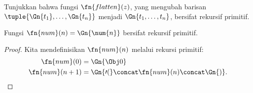 \documentclass[../../../include/open-logic-section]{subfiles}
\begin{document}
\begin{prob}
Tunjukkan bahwa fungsi $\fn{flatten}(z)$, yang mengubah barisan
$\tuple{\Gn{t_1}, \dots, \Gn{t_n}}$ menjadi $\Gn{t_1, \dots, t_n}$,
bersifat rekursif primitif.
\end{prob}

\begin{prop}
  Fungsi $\fn{num}(n) = \Gn{\num{n}}$ bersifat rekursif primitif.
\end{prop}

\begin{proof}
  Kita mendefinisikan $\fn{num}(n)$ melalui rekursi primitif:
  \begin{align*}
    \fn{num}(0) & = \Gn{\Obj 0}\\
    \fn{num}(n+1) & = \Gn{\prime(} \concat \fn{num}(n) \concat \Gn{)}.
  \end{align*}
\end{proof}
\end{document}
